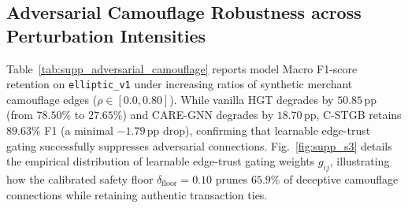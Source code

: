 \documentclass[journal,twoside]{IEEEtran}
\begin{document}
\begin{table}[htbp]
\centering
\caption{Comparative Evaluation of Conformal Risk Control against Calibration and Conformal Baselines on Elliptic-v1 ($\alpha=0.01$, Nominal Coverage $99.0\%$).}
\label{tab:supp_conformal_comparison}
\end{table}

\subsection{Adversarial Camouflage Robustness across Perturbation Intensities}

Table~\ref{tab:supp_adversarial_camouflage} reports model Macro F1-score retention on \texttt{elliptic\_v1} under increasing ratios of synthetic merchant camouflage edges ($\rho \in [0.0, 0.80]$). While vanilla HGT degrades by $50.85$\,pp (from $78.50\%$ to $27.65\%$) and CARE-GNN degrades by $18.70$\,pp, C-STGB retains $89.63\%$ F1 (a minimal $-1.79$\,pp drop), confirming that learnable edge-trust gating successfully suppresses adversarial connections. Fig.~\ref{fig:supp_s3} details the empirical distribution of learnable edge-trust gating weights $g_{ij}$, illustrating how the calibrated safety floor $\delta_{\text{floor}} = 0.10$ prunes $65.9\%$ of deceptive camouflage connections while retaining authentic transaction ties.
\end{document}
